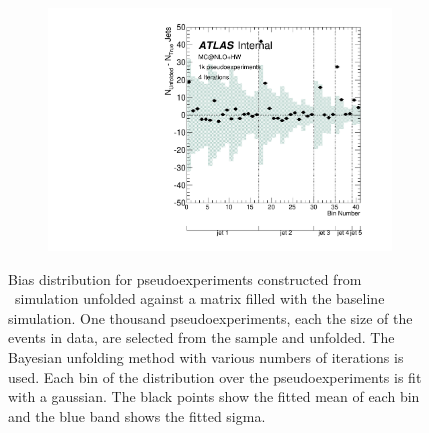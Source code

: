 \begin{figure}
\begin{subfigure}[]{0.5\textwidth}
\end{subfigure}
\begin{subfigure}[]{0.5\textwidth}
\includegraphics[width=\textwidth]{fig/Stress/105200atlfast/Bias4Iterations.pdf}
\end{subfigure}
\caption{Bias distribution for pseudoexperiments constructed from \mcnlohw\ simulation unfolded against a matrix filled with the baseline simulation. One thousand pseudoexperiments, each the size of the events in data, are selected from the sample and unfolded. The Bayesian unfolding method with various numbers of iterations is used. Each bin of the distribution over the pseudoexperiments is fit with a gaussian. The black points show the fitted mean of each bin and the blue band shows the fitted sigma. }
\label{fig:mcnlohwbias}
\end{figure}
\clearpage
